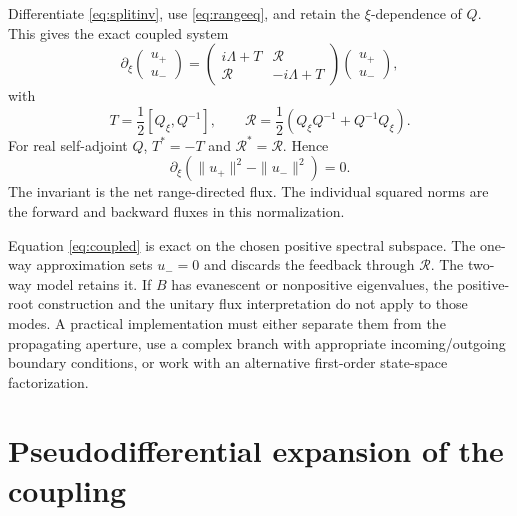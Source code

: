 \documentclass[11pt]{article}
\newcommand{\pd}{\partial}
\newcommand{\Rop}{\mathcal R}
\begin{document}
Differentiate \eqref{eq:splitinv}, use \eqref{eq:rangeeq}, and retain the
$\xi$-dependence of $Q$. This gives the exact coupled system
\begin{equation}\label{eq:coupled}
  \pd_\xi\begin{pmatrix}u_+\\u_-\end{pmatrix}=
  \begin{pmatrix}i\Lambda+T & \Rop\\
                  \Rop & -i\Lambda+T\end{pmatrix}
  \begin{pmatrix}u_+\\u_-\end{pmatrix},
\end{equation}
with
\begin{equation}\label{eq:TRexact}
  T=\frac12[Q_\xi,Q^{-1}],\qquad
  \Rop=\frac12(Q_\xi Q^{-1}+Q^{-1}Q_\xi).
\end{equation}
For real self-adjoint $Q$, $T^*=-T$ and $\Rop^*=\Rop$. Hence
\begin{equation}\label{eq:flux}
  \pd_\xi\left(\|u_+\|^2-\|u_-\|^2\right)=0.
\end{equation}
The invariant is the net range-directed flux. The individual squared norms
are the forward and backward fluxes in this normalization.

Equation \eqref{eq:coupled} is exact on the chosen positive spectral subspace.
The one-way approximation sets $u_-=0$ and discards the feedback through
$\Rop$. The two-way model retains it. If $B$ has evanescent or nonpositive
eigenvalues, the positive-root construction and the unitary flux
interpretation do not apply to those modes. A practical implementation must
either separate them from the propagating aperture, use a complex branch with
appropriate incoming/outgoing boundary conditions, or work with an alternative
first-order state-space factorization.

\section{Pseudodifferential expansion of the coupling}
\end{document}
